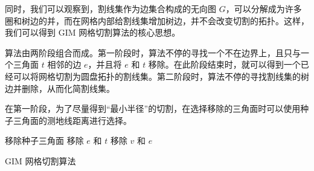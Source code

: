 同时，我们可以观察到，割线集作为边集合构成的无向图 $ G $，可以分解成为许多圈和树边的并，而在网格内部给割线集增加树边，并不会改变切割的拓扑。这样，我们可以得到 GIM 网格切割算法的核心思想。

算法由两阶段组合而成。第一阶段时，算法不停的寻找一个不在边界上，且只与一个三角面 $ t $ 相邻的边 $ e $，并且将 $ e $ 和 $ t $ 移除。在此阶段结束时，就可以得到一个已经可以将网格切割为圆盘拓扑的割线集。第二阶段时，算法不停的寻找割线集的树边并删除，从而化简割线集。

在第一阶段，为了尽量得到“最小半径”的切割，在选择移除的三角面时可以使用种子三角面的测地线距离进行选择。

\begin{algorithm}[h]
    \SetAlgoLined

    移除种子三角面\;
     {
      移除 $ e $ 和 $ t $\;
    }
     {
      移除 $ v $ 和 $ e $\;
    }
    \caption{GIM 网格切割算法}
\end{algorithm}



